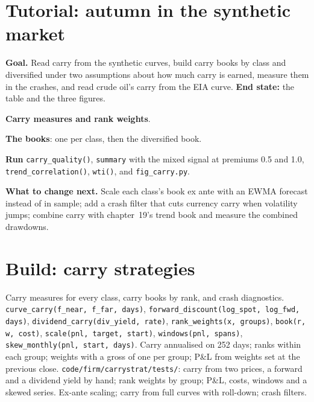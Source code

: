 \section{Tutorial: autumn in the synthetic market}\label{tut:s1:carry-across-asset-classes:tut}

\begin{tutorial}
\textbf{Goal.} Read carry from the synthetic curves, build carry books by class and diversified under two assumptions about how much carry is earned,
measure them in the crashes, and read crude oil's carry from the EIA curve. \textbf{End state:} the table and the three figures.
\begin{tutsteps}
\item \textbf{Carry measures and rank weights}.
\label{lst:s1:carry-across-asset-classes:measures}
\item \textbf{The books}: one per class, then the diversified book.
\label{lst:s1:carry-across-asset-classes:books}
\item \textbf{Run} \texttt{carry\_quality()}, \texttt{summary} with the mixed signal at premiums 0.5 and 1.0, \texttt{trend\_correlation()},
\texttt{wti()}, and \texttt{fig\_carry.py}.
\end{tutsteps}
\textbf{What to change next.} Scale each class's book ex ante with an EWMA forecast instead of in sample; add a crash filter that cuts currency carry
when volatility jumps; combine carry with chapter~19's trend book and measure the combined drawdowns.
\end{tutorial}

\section{Build: carry strategies}\label{bld:s1:carry-across-asset-classes:carrystrat}

\begin{build}
 Carry measures for every class, carry books by rank, and crash diagnostics.
 \texttt{curve\_carry(f\_near, f\_far, days)}, \texttt{forward\_discount(log\_spot, log\_fwd, days)}, \texttt{dividend\_carry(div\_yield,
rate)}, \texttt{rank\_weights(x, groups)}, \texttt{book(r, w, cost)}, \texttt{scale(pnl, target, start)}, \texttt{windows(pnl, spans)},
\texttt{skew\_monthly(pnl, start, days)}.
 Carry annualised on 252 days; ranks within each group; weights with a gross of one per group; P\&L from weights set at the previous close.
 \texttt{code/firm/carrystrat/tests/}: carry from two prices, a forward and a dividend yield by hand; rank weights by group;
P\&L, costs, windows and a skewed series.
 Ex-ante scaling; carry from full curves with roll-down; crash filters.
\end{build}

